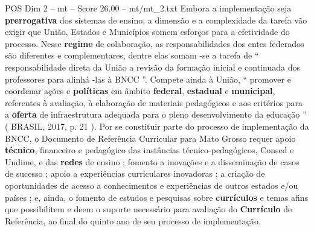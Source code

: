 \begin{textsample}{POS Dim 2 – mt – Score 26.00 – mt/mt\_2.txt}
Embora a implementação seja \textbf{prerrogativa} dos sistemas de ensino, a dimensão e a complexidade da tarefa vão exigir que União, Estados e Municípios somem esforços para a efetividade do processo.
Nesse \textbf{regime} de colaboração, as responsabilidades dos entes federados são diferentes e complementares, dentre elas somam -se a tarefa de “ responsabilidade direta da União a revisão da formação inicial e continuada dos professores para alinhá -las à BNCC ”.
Compete ainda à União, “ promover e coordenar ações e \textbf{políticas} em âmbito \textbf{federal}, \textbf{estadual} e \textbf{municipal}, referentes à avaliação, à elaboração de materiais pedagógicos e aos critérios para a \textbf{oferta} de infraestrutura adequada para o pleno desenvolvimento da educação ” ( BRASIL, 2017, p. 21 ).
Por se constituir parte do processo de implementação da BNCC, o Documento de Referência Curricular para Mato Grosso requer apoio \textbf{técnico}, financeiro e pedagógico das instâncias técnico-pedagógicos, Consed e Undime, e das \textbf{redes} de ensino ; fomento a inovações e a disseminação de casos de sucesso ; apoio a experiências curriculares inovadoras ; a criação de oportunidades de acesso a conhecimentos e experiências de outros estados e/ou países ; e, ainda, o fomento de estudos e pesquisas sobre \textbf{currículos} e temas afins que possibilitem e deem o suporte necessário para avaliação do \textbf{Currículo} de Referência, ao final do quinto ano de seu processo de implementação.

\end{textsample}
